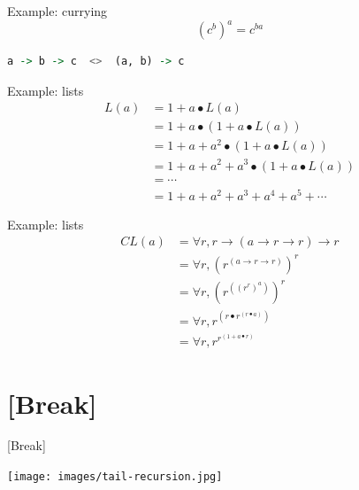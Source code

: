 \documentclass[utf8x,notes,17pt]{beamer}
\begin{document}
\begin{frame}[fragile,label=sec-7-33]{Example: currying}
\[ (c^{b})^{a} = c^{b a} \]

\vspace{1ex}
\begin{center}
\begin{lstlisting}[language=Haskell]
   a -> b -> c  <>  (a, b) -> c
\end{lstlisting}
\end{center}
\end{frame}
\begin{frame}[fragile,label=sec-7-34]{Example: lists}
\vspace{-2ex}
\begin{align*}
L(a) &= 1 + a ∙ L(a)                                      \\
     &= 1 + a ∙ (1 + a ∙ L(a))                            \\
     &= 1 + a + a^{2} ∙ (1 + a ∙ L(a))                    \\
     &= 1 + a + a^{2} + a^{3} ∙ (1 + a ∙ L(a))            \\
     &= \cdots{}                                          \\
     &= 1 + a + a^{2} + a^{3} + a^{4} + a^{5} + \cdots{}
\end{align*}
\end{frame}
\begin{frame}[fragile,label=sec-7-35]{Example: lists}
\vspace{-2ex}
\begin{align*}
CL(a) &= ∀ r, r → (a → r → r) → r     \\
      &= ∀ r, (r^{(a → r → r)})^{r}   \\
      &= ∀ r, (r^{((r^{r})^{a})})^{r} \\
      &= ∀ r, r^{(r ∙ r^{(r ∙ a)})}   \\
      &= ∀ r, r^{r^{(1 + a ∙ r)}}
\end{align*}
\end{frame}
\section{[Break]}
\label{sec-8}
\begin{frame}[fragile,label=sec-8-1]{[Break]}
\begin{center}
\texttt{[image: images/tail-recursion.jpg]}
\end{center}
\end{frame}
\end{document}
